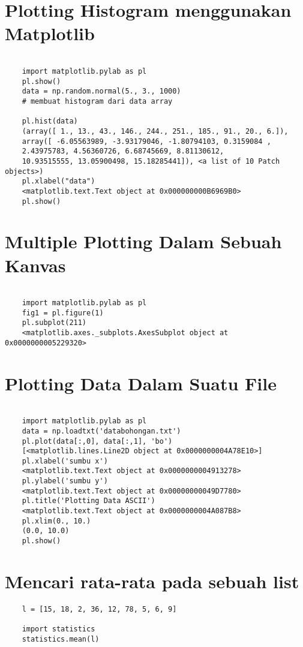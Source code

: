 \documentclass[12pt]{article} %
\begin{document}
\section {Plotting Histogram menggunakan Matplotlib}
\begin{lstlisting}

	import matplotlib.pylab as pl
	pl.show()
	data = np.random.normal(5., 3., 1000)
	# membuat histogram dari data array
	
	pl.hist(data)
	(array([ 1., 13., 43., 146., 244., 251., 185., 91., 20., 6.]),
	array([ -6.05563989, -3.93179046, -1.80794103, 0.3159084 ,
	2.43975783, 4.56360726, 6.68745669, 8.81130612,
	10.93515555, 13.05900498, 15.18285441]), <a list of 10 Patch objects>)
	pl.xlabel("data")
	<matplotlib.text.Text object at 0x000000000B6969B0>
	pl.show()
\end{lstlisting}

\section {Multiple Plotting Dalam Sebuah Kanvas}
\begin{lstlisting}
	
	import matplotlib.pylab as pl
	fig1 = pl.figure(1)
	pl.subplot(211)
	<matplotlib.axes._subplots.AxesSubplot object at 0x0000000005229320>
\end{lstlisting}

\section {Plotting Data Dalam Suatu File}
\begin{lstlisting}

	import matplotlib.pylab as pl
	data = np.loadtxt('databohongan.txt')
	pl.plot(data[:,0], data[:,1], 'bo')
	[<matplotlib.lines.Line2D object at 0x0000000004A78E10>]
	pl.xlabel('sumbu x')
	<matplotlib.text.Text object at 0x0000000004913278>
	pl.ylabel('sumbu y')
	<matplotlib.text.Text object at 0x00000000049D7780>
	pl.title('Plotting Data ASCII')
	<matplotlib.text.Text object at 0x0000000004A087B8>
	pl.xlim(0., 10.)
	(0.0, 10.0)
	pl.show()
\end{lstlisting}

\section {Mencari rata-rata pada sebuah list}
\begin{lstlisting}
	l = [15, 18, 2, 36, 12, 78, 5, 6, 9]
	
	import statistics
	statistics.mean(l)
\end{lstlisting}
\end{document}
